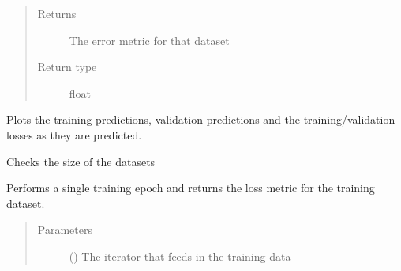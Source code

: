 \documentclass[letterpaper,10pt,english]{sphinxmanual}
\begin{document}
\begin{fulllineitems}
\begin{fulllineitems}
\begin{quote}
\begin{description}
\begin{itemize}
\end{itemize}

\item[{Returns}] \leavevmode
The error metric for that dataset

\item[{Return type}] \leavevmode
float

\end{description}\end{quote}

\end{fulllineitems}


\begin{fulllineitems}
\label{\detokenize{index:Forecaster.deeplearning.DeepLearning.live_pred_plot}}
Plots the training predictions, validation predictions and the
training/validation losses as they are predicted.

\end{fulllineitems}


\begin{fulllineitems}
\label{\detokenize{index:Forecaster.deeplearning.DeepLearning.size_check}}
Checks the size of the datasets

\end{fulllineitems}


\begin{fulllineitems}
\label{\detokenize{index:Forecaster.deeplearning.DeepLearning.train}}
Performs a single training epoch and returns the loss metric
for the training dataset.
\begin{quote}\begin{description}
\item[{Parameters}] \leavevmode
{} () \textendash{} The iterator that feeds in the training data


\end{description}
\end{quote}
\end{fulllineitems}
\end{fulllineitems}
\end{document}
